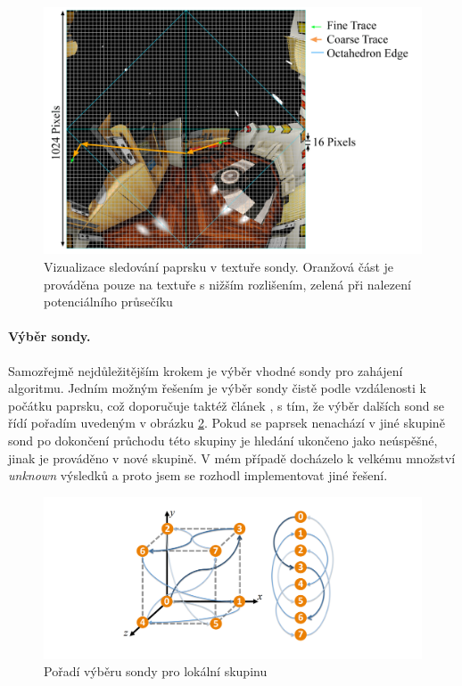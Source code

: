 \begin{figure}[H]
	\centering
	\includegraphics[scale=1]{images/lfp_trace.png}
	\caption{Vizualizace sledování paprsku v textuře sondy. Oranžová část je prováděna pouze na textuře s nižším rozlišením, zelená při nalezení potenciálního průsečíku}
	\label{fig:lfp_trace}
\end{figure}

\paragraph{Výběr sondy.} Samozřejmě nejdůležitějším krokem je výběr vhodné sondy pro zahájení algoritmu. Jedním možným řešením je výběr sondy čistě podle vzdálenosti k počátku paprsku, což doporučuje taktéž článek \cite{light_field_probes}, s tím, že výběr dalších sond se řídí pořadím uvedeným v obrázku \ref{fig:lfp_cube}. Pokud se paprsek nenachází v jiné skupině sond po dokončení průchodu této skupiny je hledání ukončeno jako neúspěšné, jinak je prováděno v nové skupině. V mém případě docházelo k velkému množství \textit{unknown} výsledků a proto jsem se rozhodl implementovat jiné řešení. 

\begin{figure}[H]
	\centering
	\includegraphics[scale=1]{images/probe_cube.png}
	\caption{Pořadí výběru sondy pro lokální skupinu}
	\label{fig:lfp_cube}
\end{figure}

